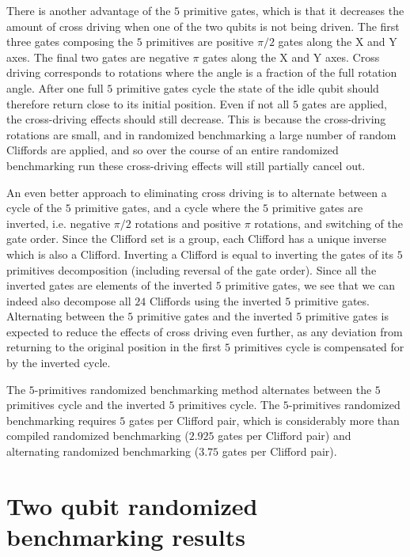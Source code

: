         There is another advantage of the $5$ primitive gates, which is that it decreases the amount of cross driving when one of the two qubits is not being driven. The first three gates composing the $5$ primitives are positive $\pi/2$ gates along the X and Y axes. The final two gates are negative $\pi$ gates along the X and Y axes. Cross driving corresponds to rotations where the angle is a fraction of the full rotation angle. After one full $5$ primitive gates cycle the state of the idle qubit should therefore return close to its initial position. Even if not all $5$ gates are applied, the cross-driving effects should still decrease. This is because the cross-driving rotations are small, and in randomized benchmarking a large number of random Cliffords are applied, and so over the course of an entire randomized benchmarking run these cross-driving effects will still partially cancel out.

        An even better approach to eliminating cross driving is to alternate between a cycle of the $5$ primitive gates, and a cycle where the $5$ primitive gates are inverted, i.e. negative $\pi/2$ rotations and positive $\pi$ rotations, and switching of the gate order. Since the Clifford set is a group, each Clifford has a unique inverse which is also a Clifford. Inverting a Clifford is equal to inverting the gates of its $5$ primitives decomposition (including reversal of the gate order). Since all the inverted gates are elements of the inverted $5$ primitive gates, we see that we can indeed also decompose all $24$ Cliffords using the inverted $5$ primitive gates. Alternating between the $5$ primitive gates and the inverted $5$ primitive gates is expected to reduce the effects of cross driving even further, as any deviation from returning to the original position in the first $5$ primitives cycle is compensated for by the inverted cycle.

        The $5$-primitives randomized benchmarking method alternates between the $5$ primitives cycle and the inverted $5$ primitives cycle. The $5$-primitives randomized benchmarking requires $5$ gates per Clifford pair, which is considerably more than compiled randomized benchmarking ($2.925$ gates per Clifford pair) and alternating randomized benchmarking ($3.75$ gates per Clifford pair).

        \section{Two qubit randomized benchmarking results}
          \label{Two qubit randomized benchmarking results}

